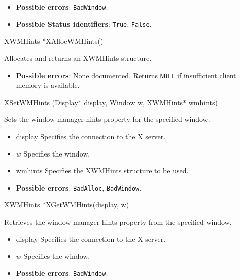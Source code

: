 \documentclass{report}
\begin{document}
\begin{itemize}
            \begin{itemize}
                \item \textbf{Possible errors}: \texttt{BadWindow}.
                \item \textbf{Possible Status identifiers}: \texttt{True}, \texttt{False}.
            \end{itemize}

            \begin{cppcode}
            XWMHints *XAllocWMHints()
            \end{cppcode}
            \bigbreak \noindent
            Allocates and returns an XWMHints structure.

            \begin{itemize}
                \item \textbf{Possible errors}: None documented. Returns \texttt{NULL} if insufficient client memory is available.
            \end{itemize}

            \begin{cppcode}
            XSetWMHints (Display* display, Window w, XWMHints* wmhints)
            \end{cppcode}
            \bigbreak \noindent
            Sets the window manager hints property for the specified window.

            \begin{itemize}
                \item display Specifies the connection to the X server.
                \item $w$ Specifies the window.
                \item wmhints Specifies the XWMHints structure to be used.
            \end{itemize}

            \begin{itemize}
                \item \textbf{Possible errors}: \texttt{BadAlloc}, \texttt{BadWindow}.
            \end{itemize}

            \begin{cppcode}
                XWMHints *XGetWMHints(display, w)
            \end{cppcode}
            \bigbreak \noindent
            Retrieves the window manager hints property from the specified window.
            \begin{itemize}
                \item display Specifies the connection to the X server.
                \item $w$ Specifies the window.
            \end{itemize}
            \begin{itemize}
                \item \textbf{Possible errors}: \texttt{BadWindow}.
            \end{itemize}


\end{itemize}
\end{document}
